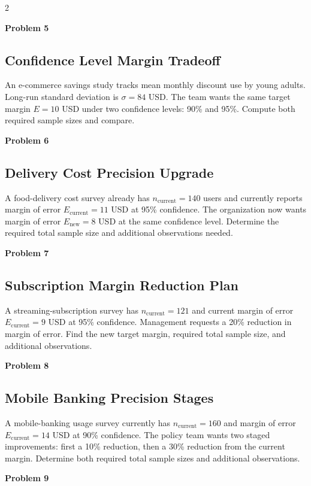 \documentclass[12pt]{article}
\newcommand{\SubsectionBox}[1]{%
	\noindent\colorbox{gray!30}{\parbox{\linewidth}{\textbf{#1}}}\par\vspace{0.35cm}%
}
\begin{document}
\begin{multicols}{2}
		\vspace{0.5cm}
		\SubsectionBox{Problem 5}
		\subsection*{Confidence Level Margin Tradeoff}
		An e-commerce savings study tracks mean monthly discount use by young adults. Long-run standard deviation is $\sigma = 84$ USD. The team wants the same target margin $E = 10$ USD under two confidence levels: 90\% and 95\%. Compute both required sample sizes and compare.
		
		\vspace{0.5cm}
		\SubsectionBox{Problem 6}
		\subsection*{Delivery Cost Precision Upgrade}
		A food-delivery cost survey already has $n_{\text{current}} = 140$ users and currently reports margin of error $E_{\text{current}} = 11$ USD at 95\% confidence. The organization now wants margin of error $E_{\text{new}} = 8$ USD at the same confidence level. Determine the required total sample size and additional observations needed.
		
		\vspace{0.5cm}
		\SubsectionBox{Problem 7}
		\subsection*{Subscription Margin Reduction Plan}
		A streaming-subscription survey has $n_{\text{current}} = 121$ and current margin of error $E_{\text{current}} = 9$ USD at 95\% confidence. Management requests a 20\% reduction in margin of error. Find the new target margin, required total sample size, and additional observations.
		
		\vspace{0.5cm}
		\SubsectionBox{Problem 8}
		\subsection*{Mobile Banking Precision Stages}
		A mobile-banking usage survey currently has $n_{\text{current}} = 160$ and margin of error $E_{\text{current}} = 14$ USD at 90\% confidence. The policy team wants two staged improvements: first a 10\% reduction, then a 30\% reduction from the current margin. Determine both required total sample sizes and additional observations.
		
		\vspace{0.5cm}
		\SubsectionBox{Problem 9}

\end{multicols}
\end{document}
